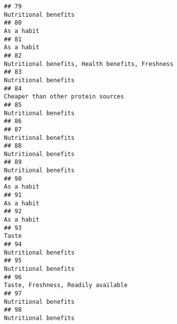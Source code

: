 \documentclass[
]{article}
\begin{document}
\begin{verbatim}
## 79                                                                                                        Nutritional benefits
## 80                                                                                                                  As a habit
## 81                                                                                                                  As a habit
## 82                                                                            Nutritional benefits, Health benefits, Freshness
## 83                                                                                                        Nutritional benefits
## 84                                                                                          Cheaper than other protein sources
## 85                                                                                                        Nutritional benefits
## 86                                                                                                                            
## 87                                                                                                        Nutritional benefits
## 88                                                                                                        Nutritional benefits
## 89                                                                                                        Nutritional benefits
## 90                                                                                                                  As a habit
## 91                                                                                                                  As a habit
## 92                                                                                                                  As a habit
## 93                                                                                                                       Taste
## 94                                                                                                        Nutritional benefits
## 95                                                                                                        Nutritional benefits
## 96                                                                                         Taste, Freshness, Readily available
## 97                                                                                                        Nutritional benefits
## 98                                                                                                        Nutritional benefits

\end{verbatim}
\end{document}
